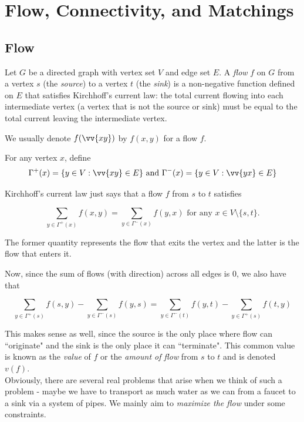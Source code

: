 \clearpage
\section{Flow, Connectivity, and Matchings}

\subsection{Flow}

\begin{fdef}[Flow]
    Let $G$ be a directed graph with vertex set $V$ and edge set $E$. A \textit{flow} $f$ on $G$ from a vertex $s$ (the \textit{source}) to a vertex $t$ (the \textit{sink}) is a non-negative function defined on $E$ that satisfies Kirchhoff's current law: the total current flowing into each intermediate vertex (a vertex that is not the source or sink) must be equal to the total current leaving the intermediate vertex.
\end{fdef}

We usually denote $f(\vv{xy})$ by $f(x,y)$ for a flow $f$.

For any vertex $x$, define
\[
    \Gamma^+(x) = \{y\in V: \vv{xy}\in E\} \text{ and } \Gamma^-(x) = \{y\in V: \vv{yx}\in E\}
\]

Kirchhoff's current law just says that a flow $f$ from $s$ to $t$ satisfies

\[
    \sum_{y\in \Gamma^+(x)} f(x,y) = \sum_{y\in \Gamma^-(x)} f(y,x) \text{ for any }x\in V\setminus\{s,t\}.
\]

The former quantity represents the flow that exits the vertex and the latter is the flow that enters it.

Now, since the sum of flows (with direction) across all edges is $0$, we also have that

\[
    \sum_{y\in\Gamma^+(s)}f(s,y) - \sum_{y\in\Gamma^-(s)}f(y,s) = \sum_{y\in\Gamma^-(t)}f(y,t) - \sum_{y\in\Gamma^+(s)}f(t,y)
\]

This makes sense as well, since the source is the only place where flow can ``originate" and the sink is the only place it can ``terminate". This common value is known as the \textit{value} of $f$ or the \textit{amount of flow} from $s$ to $t$ and is denoted $v(f)$.\\

Obviously, there are several real problems that arise when we think of such a problem - maybe we have to transport as much water as we can from a faucet to a sink via a system of pipes. We mainly aim to \textit{maximize the flow} under some constraints.\\

